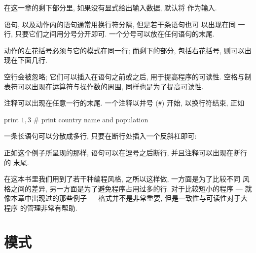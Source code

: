 在这一章的剩下部分里, 如果没有显式给出输入数据, 默认将 
作为输入.


\patact 语句, 以及动作内的语句通常用换行符分隔, 但是若干条语句也可
以出现在同
一行, 只要它们之间用分号分开即可. 一个分号可以放在任何语句的末尾.

动作的左花括号必须与它的模式在同一行; 而剩下的部分, 包括右花括号, 则可以出
现在下面几行.

空行会被忽略; 它们可以插入在语句之前或之后, 用于提高程序的可读性. 空格与制
表符可以出现在运算符与操作数的周围, 同样也是为了提高可读性.

注释可以出现在任意一行的末尾. 一个注释以井号 (\verb'#') 开始,
以换行符结束, 正如
\begin{awkcode}
    { print $1, $3 }    # print country name and population
\end{awkcode}

一条长语句可以分散成多行, 只要在断行处插入一个反斜杠即可:
正如这个例子所呈现的那样, 语句可以在逗号之后断行, 并且注释可以出现在断行的
末尾.

在这本书里我们用到了若干种编程风格, 之所以这样做, 一方面是为了比较不同
风格之间的差异, 另一方面是为了避免程序占用过多的行. 对于比较短小的程序
--- 就像本章中出现过的那些例子 ---
格式并不是非常重要, 但是一致性与可读性对于大程序
的管理非常有帮助.

\section{模式}
\label{sec:patterns}

